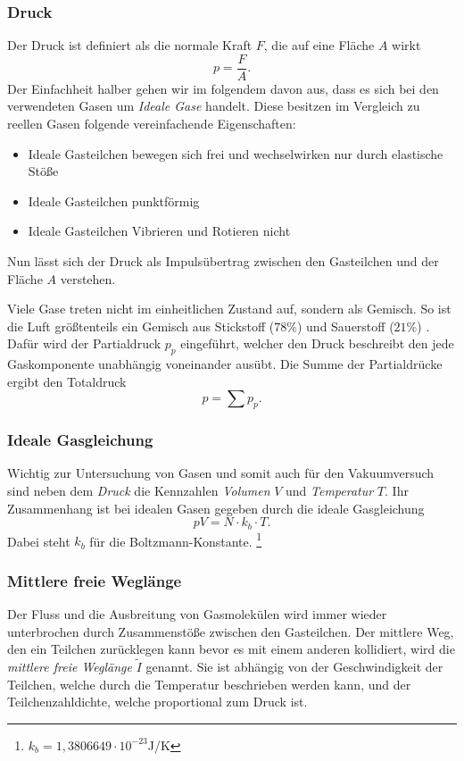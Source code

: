 \subsubsection{Druck}
Der Druck ist definiert als die normale Kraft $F$, die auf eine Fläche $A$ wirkt
\begin{equation}
    p = \frac{F}{A}. \label{eq:Druck}
\end{equation}
Der Einfachheit halber gehen wir im folgendem davon aus, 
dass es sich bei den verwendeten Gasen um \textit{Ideale Gase} handelt.
Diese besitzen im Vergleich zu reellen Gasen folgende vereinfachende Eigenschaften:
\begin{itemize}
    \item Ideale Gasteilchen bewegen sich frei und wechselwirken nur durch elastische Stöße
    \item Ideale Gasteilchen punktförmig
    \item Ideale Gasteilchen Vibrieren und Rotieren nicht 
\end{itemize}
Nun lässt sich der Druck als Impulsübertrag zwischen den Gasteilchen und der Fläche $A$ verstehen.  

Viele Gase treten nicht im einheitlichen Zustand auf, sondern als Gemisch.
So ist die Luft größtenteils ein Gemisch aus Stickstoff ($78\%$) und Sauerstoff ($21\%$) \cite{luft}. 
Dafür wird der Partialdruck $p_p$ eingeführt, 
welcher den Druck beschreibt den jede Gaskomponente unabhängig voneinander ausübt.
Die Summe der Partialdrücke ergibt den Totaldruck
\begin{equation}
    p = \sum p_p.
\end{equation}

\subsubsection{Ideale Gasgleichung}
Wichtig zur Untersuchung von Gasen 
und somit auch für den Vakuumversuch sind neben dem \textit{Druck} die Kennzahlen \textit{Volumen} $V$
und \textit{Temperatur} $T$.
Ihr Zusammenhang ist bei idealen Gasen gegeben durch die ideale Gasgleichung
\begin{equation}
    pV=N\cdot k_b\cdot T. \label{eq:idealgaß}
\end{equation}
Dabei steht $k_b$ für die Boltzmann-Konstante. \footnote{$k_b = 1,3806649\cdot10^{-23}$J/K}

\subsubsection{Mittlere freie Weglänge}
Der Fluss und die Ausbreitung von Gasmolekülen wird immer wieder unterbrochen durch Zusammenstöße zwischen den Gasteilchen.
Der mittlere Weg, 
den ein Teilchen zurücklegen kann bevor es mit einem anderen kollidiert, wird die \textit{mittlere freie Weglänge} $\tilde{I}$ genannt.
Sie ist abhängig von der Geschwindigkeit der Teilchen, welche durch die Temperatur beschrieben werden kann,
und der Teilchenzahldichte, welche proportional zum Druck ist.  

